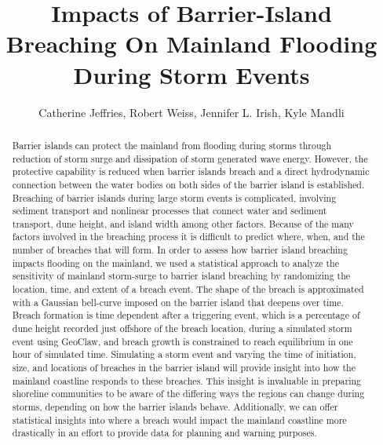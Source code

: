 \documentclass{coastal_paper}
\title{Impacts of Barrier-Island Breaching On Mainland Flooding During Storm Events}
\author{Catherine Jeffries, Robert Weiss, Jennifer L. Irish, Kyle Mandli}
\begin{document}
\maketitle
\begin{abstract}
Barrier islands can protect the mainland from flooding during storms through reduction of storm surge and dissipation of storm generated wave energy. However, the protective capability is reduced when barrier islands breach and a direct hydrodynamic connection between the water bodies on both sides of the barrier island is established. Breaching of barrier islands during large storm events is complicated, involving sediment transport and nonlinear processes that connect water and sediment transport, dune height, and island width among other factors. Because of the many factors involved in the breaching process it is difficult to predict where, when, and the number of breaches that will form. In order to assess how barrier island breaching impacts flooding on the mainland, we used a statistical approach to analyze the sensitivity of mainland storm-surge to barrier island breaching by randomizing the location, time, and extent of a breach event. The shape of the breach is approximated with a Gaussian bell-curve imposed on the barrier island that deepens over time. Breach formation is time dependent after a triggering event, which is a percentage of dune height recorded just offshore of the breach location, during a simulated storm event using GeoClaw, and breach growth is constrained to reach equilibrium in one hour of simulated time. Simulating a storm event and varying the time of initiation, size, and locations of breaches in the barrier island will provide insight into how the mainland coastline responds to these breaches. This insight is invaluable in preparing shoreline communities to be aware of the differing ways the regions can change during storms, depending on how the barrier islands behave. Additionally, we can offer statistical insights into where a breach would impact the mainland coastline more drastically in an effort to provide data for planning and warning purposes.    
\end{abstract}
\newpage

\linenumbers
\end{document}
